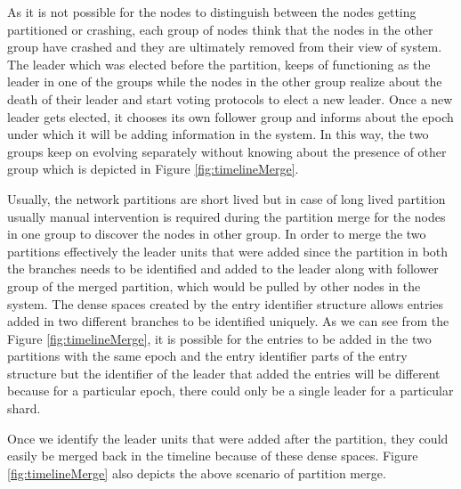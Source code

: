 \documentclass[a4paper,11pt]{kth-mag}
\begin{document}
\par As it is not possible for the nodes to distinguish between the nodes getting partitioned or crashing, each group of nodes think that the nodes in the other group have crashed and they are ultimately removed from their view of system. The leader which was elected before the partition, keeps of functioning as the leader in one of the groups while the nodes in the other group realize about the death of their leader and start voting protocols to elect a new leader. Once a new leader gets elected, it chooses its own follower group and informs about the epoch under which it will be adding information in the system. In this way, the two groups keep on evolving separately without knowing about the presence of other group which is depicted in Figure \ref{fig:timelineMerge}.

\par Usually, the network partitions are short lived but in case of long lived partition usually manual intervention is required during the partition merge for the nodes in one group to discover the nodes in other group. In order to merge the two partitions effectively the leader units that were added since the partition in both the branches needs to be identified and added to the leader along with follower group of the merged partition, which would be pulled by other nodes in the system. The dense spaces created by the entry identifier structure allows entries added in two different branches to be identified uniquely. As we can see from the Figure \ref{fig:timelineMerge}, it is possible for the entries to be added in the two partitions with the same epoch and the entry identifier parts of the entry structure but the identifier of the leader that added the entries will be different because for a particular epoch, there could only be a single leader for a particular shard.

\par Once we identify the leader units that were added after the partition, they could easily be merged back in the timeline because of these dense spaces. Figure \ref{fig:timelineMerge} also depicts the above scenario of partition merge.
\end{document}

